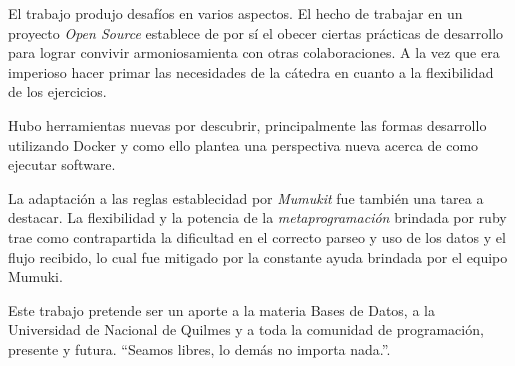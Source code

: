 
El trabajo produjo desafíos en varios aspectos.
El hecho de trabajar en un proyecto \textit{Open Source}
establece de por sí el obecer ciertas prácticas de desarrollo
para lograr convivir armoniosamienta con otras colaboraciones.
A la vez que era imperioso hacer primar las necesidades
de la cátedra en cuanto a la flexibilidad de los ejercicios.

Hubo herramientas nuevas por descubrir, principalmente
las formas desarrollo utilizando Docker y como ello
plantea una perspectiva nueva acerca de como ejecutar software.

La adaptación a las reglas establecidad por \textit{Mumukit}
fue también una tarea a destacar. La flexibilidad y la potencia
de la \textit{metaprogramación} brindada por ruby
trae como contrapartida la dificultad
en el correcto parseo y uso de los datos y el flujo recibido,
lo cual fue mitigado por la constante ayuda brindada por el equipo Mumuki.

Este trabajo pretende ser un aporte a la materia Bases de Datos,
a la Universidad de Nacional de Quilmes y a toda la comunidad
de programación, presente y futura.
\enquote{Seamos libres, lo demás no importa nada.}.


